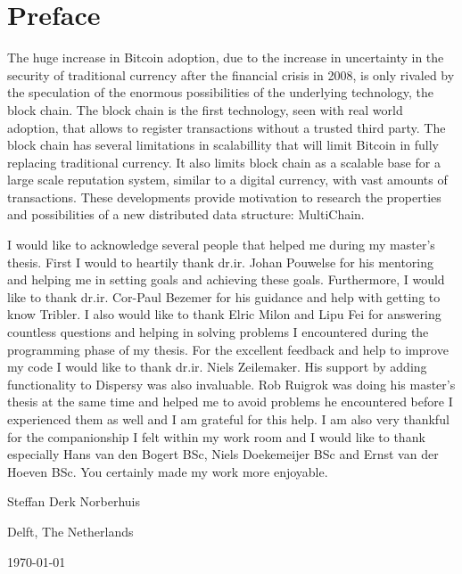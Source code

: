 \chapter*{Preface}
The huge increase in Bitcoin adoption, 
due to the increase in uncertainty in the security of traditional currency 
after the financial crisis in 2008, 
is only rivaled by the speculation of the enormous possibilities 
of the underlying technology, the block chain.
The block chain is the first technology, seen with real world adoption,
that allows to register transactions without a trusted third party.
The block chain has several limitations in scalabillity
that will limit Bitcoin in fully replacing traditional currency.
It also limits block chain as a scalable base for a large scale reputation system,
similar to a digital currency, with vast amounts of transactions.
These developments provide motivation to research the properties and possibilities of a new distributed data structure:
MultiChain.

\vspace{1\baselineskip}

\noindent
I would like to acknowledge several people that helped me during my master's thesis.
First I would to heartily thank dr.ir. Johan Pouwelse for his mentoring and
helping me in setting goals and achieving these goals.
Furthermore, I would like to thank dr.ir. Cor-Paul Bezemer for his guidance and help with getting to know Tribler.
I also would like to thank Elric Milon and Lipu Fei for answering countless questions
and helping in solving problems I encountered during the programming phase of my thesis.
For the excellent feedback and help to improve my code I would like to thank dr.ir. Niels Zeilemaker.
His support by adding functionality to Dispersy was also invaluable.
Rob Ruigrok was doing his master's thesis at the same time
and helped me to avoid problems he encountered before I experienced them as well and
I am grateful for this help.
I am also very thankful for the companionship I felt within my work room 
and I would like to thank especially Hans van den Bogert BSc, Niels Doekemeijer BSc and Ernst van der Hoeven BSc.
You certainly made my work more enjoyable.

\vspace{1\baselineskip}

\noindent
Steffan Derk Norberhuis

\vspace{1\baselineskip}

\noindent
Delft, The Netherlands

\noindent
\today
